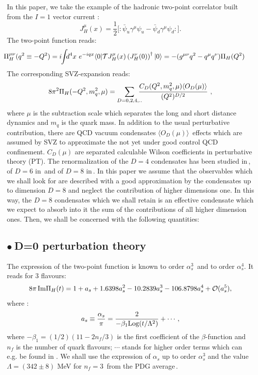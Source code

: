 \documentclass[review]{elsarticle}
\def\beq{\begin{equation}}
\def\eeq{\end{equation}}
\def\ga{\left(}
\def\dr{\right)}
\def\la{\langle}
\def\ra{\rangle}
\def\b{$\bullet~$}
\begin{document}
 In this paper, we take  the example of the hadronic two-point correlator built from the $I=1$  vector current :
\beq
 J^\mu_H(x)=\frac{1}{2}{[}: \bar\psi_u\gamma^\mu\psi_u-\bar\psi_d\gamma^\mu\psi_d:{]}.
 \eeq
The two-point function reads: 
\beq
\hspace*{-0.6cm} \Pi^{\mu\nu}_H(q^2\equiv-Q^2)=i\hspace*{-0.1cm}\int \hspace*{-0.15cm}d^4x ~e^{-iqx}\la 0\vert {\cal T} {J^\mu_H}(x)\ga {J^\nu_H}(0)\dr^\dagger \vert 0\ra=-(g^{\mu\nu}q^2-q^\mu q^\nu)\Pi_H(Q^2)
 \label{eq:2-point}
 \eeq
The corresponding SVZ-expansion reads:
\beq
8\pi^2\Pi_H(-Q^2,m_q^2,\mu)=\sum_{D=0,2,4,..}\hspace*{-0.25cm}\frac{C_{D}(Q^2,m_q^2,\mu)\la O_{D}(\mu)\ra}{(Q^2)^{D/2}}~, 
\label{eq:ope}
\eeq
where $\mu$ is the subtraction scale which separates the long and short distance dynamics and $m_q$ is the quark mass. In addition to the usual perturbative contribution, there are QCD vacuum condensates $\la O_{D}(\mu)\ra$\ effects which are assumed by SVZ to approximate  the not yet under good control QCD confinement.  $C_{D}(\mu)$ are separated calculable Wilson coefficients in perturbative theory (PT).  The renormalization of the $D=4$ condensates has been studied in\,\cite{TARRACH,ESPRIU}, of $D=6$ in\,\cite{SNTARRACH} and of $D=8$ in\,\cite{BAGAN}.  In this paper we assume that the observables which we shall look for are described with a good approximation by the condensates up to dimension $D=8$ and neglect the contribution of higher dimensions one. In this way, the $D=8$ condensates which we shall retain is an effective condensate which we expect to absorb into it the sum of the contributions of all higher dimension ones. Then, we shall be concerned with the following quantities:
\subsection*{\b D=0 perturbation theory}
The expression of the two-point function is known to order $\alpha_s^3$\,\cite{LARIN} and to order $\alpha_s^4$\cite{CHET4}. It reads for 3 flavours:
\beq
8{\pi}\,{\rm Im}\Pi_H(t)=  1+a_s+1.6398a_s^2-10.2839a_s^3-106.8798a_s^4+{\cal O}(a_s^5),
\label{eq:pt}
\eeq
where : 
\beq
a_s\equiv \frac{\alpha_s}{\pi}=\frac{2}{-\beta_1{\rm Log} (t/\Lambda^2)}+\cdots,
\eeq 
where $-\beta_1=(1/2)(11-2n_f/3)$ is the first coefficient of the $\beta$-function and $n_f$ is the number of quark flavours;  $\cdots$ stands for higher order terms which can e.g. be found in \cite{SNB2}. We shall use the expression of $\alpha_s$ up to order $\alpha_s^3$ and the value $\Lambda =(342\pm 8)$ MeV  for  $n_f=3$\:\, from the PDG average\,\cite{PDG}.
\end{document}
